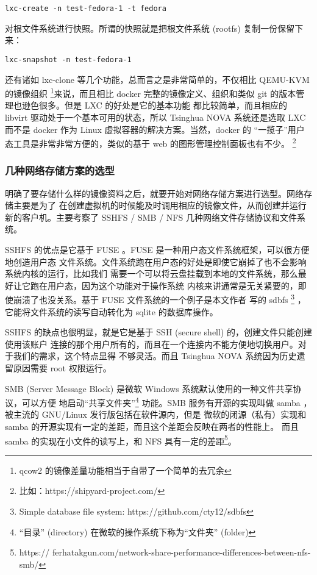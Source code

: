 \begin{lstlisting}
lxc-create -n test-fedora-1 -t fedora
\end{lstlisting}

对根文件系统进行快照。所谓的快照就是把根文件系统 (rootfs) 复制一份保留下来：

\begin{lstlisting}
lxc-snapshot -n test-fedora-1
\end{lstlisting}

还有诸如 lxc-clone 等几个功能，总而言之是非常简单的，不仅相比 QEMU-KVM 的镜像组织
\footnote{qcow2 的镜像差量功能相当于自带了一个简单的去冗余}来说，而且相比 docker
完整的镜像定义、组织和类似 git 的版本管理也逊色很多。但是 LXC 的好处是它的基本功能
都比较简单，而且相应的 libvirt 驱动处于一个基本可用的状态，所以 Tsinghua NOVA
系统还是选取 LXC 而不是 docker 作为 Linux 虚拟容器的解决方案。当然，docker 的
“一揽子”用户态工具是非常非常方便的，类似的基于 web 的图形管理控制面板也有不少。
\footnote{比如：https://shipyard-project.com/}

\subsubsection{几种网络存储方案的选型}
\label{subsubsec:network-storage}

明确了要存储什么样的镜像资料之后，就要开始对网络存储方案进行选型。网络存储主要是为了
在创建虚拟机的时候能及时调用相应的镜像文件，从而创建并运行新的客户机。主要考察了
SSHFS / SMB / NFS 几种网络文件存储协议和文件系统。

SSHFS 的优点是它基于 FUSE 。FUSE 是一种用户态文件系统框架，可以很方便地创造用户态
文件系统。文件系统跑在用户态的好处是即使它崩掉了也不会影响系统内核的运行，比如我们
需要一个可以将云盘挂载到本地的文件系统，那么最好让它跑在用户态，因为这个功能对于操作系统
内核来讲通常是无关紧要的，即使崩溃了也没关系。基于 FUSE 文件系统的一个例子是本文作者
写的 sdbfs \footnote{Simple database file system:
https://github.com/cty12/sdbfs} ，它能将文件系统的读写自动转化为 sqlite 的数据库操作。

SSHFS 的缺点也很明显，就是它是基于 SSH (secure shell) 的，创建文件只能创建使用该账户
连接的那个用户所有的，而且在一个连接内不能方便地切换用户。对于我们的需求，这个特点显得
不够灵活。而且 Tsinghua NOVA 系统因为历史遗留原因需要 root 权限运行。

SMB (Server Message Block) 是微软 Windows 系统默认使用的一种文件共享协议，可以方便
地启动“共享文件夹”\footnote{“目录” (directory) 在微软的操作系统下称为“文件夹” (folder)}
功能。SMB 服务有开源的实现叫做 samba ，被主流的 GNU/Linux 发行版包括在软件源内，但是
微软的闭源（私有）实现和 samba 的开源实现有一定的差距，而且这个差距会反映在两者的性能上。
而且 samba 的实现在小文件的读写上，和 NFS 具有一定的差距\footnote{https://
ferhatakgun.com/network-share-performance-differences-between-nfs-smb/}。

